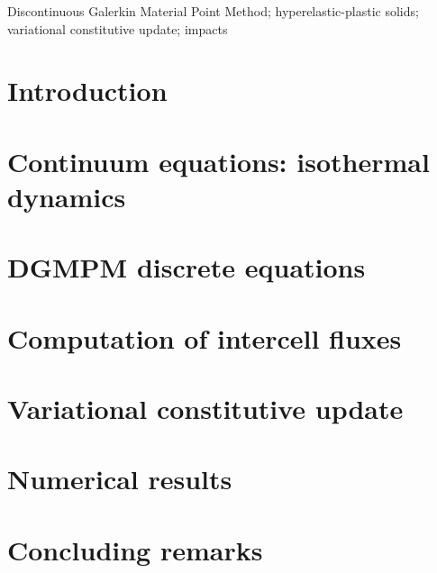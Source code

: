 \documentclass[final,3p,times]{elsarticle}
\begin{document}
\begin{frontmatter}
  \begin{keyword}
    Discontinuous Galerkin Material Point Method; hyperelastic-plastic solids; variational constitutive update; impacts
  \end{keyword}
  
\end{frontmatter}



\section{Introduction}
\label{sec:introduction}


\section{Continuum equations: isothermal dynamics}
\label{sec:continuum_problem}


\section{DGMPM discrete equations}
\label{sec:discretization}


\section{Computation of intercell fluxes}
\label{sec:riemann_solver}


\section{Variational constitutive update}
\label{sec:constitutive-update}


\section{Numerical results}
\label{sec:test_cases}



\section{Concluding remarks}
\label{sec:conclusion}




\end{document}
